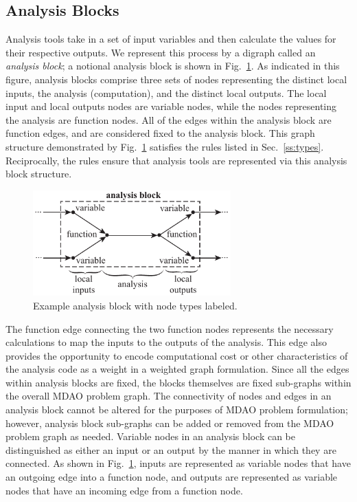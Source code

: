 \subsection{Analysis Blocks}
\label{ss:analysis blocks}
Analysis tools take in a set of input variables and then calculate 
the values for their respective outputs. We represent this process
by a digraph called an \emph{analysis block}; a notional analysis block is shown in Fig.~\ref{f:analysis block}. 
As indicated in this figure, analysis blocks comprise three sets of nodes representing the distinct local inputs, the analysis (computation), and the distinct local outputs. The local input and local outputs nodes are variable nodes, while the nodes representing the analysis are function nodes. All of the edges within the analysis block are function edges, and are considered fixed to the analysis block. This graph structure demonstrated by Fig.~\ref{f:analysis block} satisfies the rules listed in Sec.~\ref{ss:types}. Reciprocally, the rules ensure that analysis tools are represented via this analysis block structure.
\begin{figure}[htb]
    \begin{center}
    \includegraphics[width=3.0in]{images/analysis_block}
    \end{center}
    \vspace{-10pt}
\caption{Example analysis block with node types labeled.}
\label{f:analysis block}
\end{figure}

The function edge connecting the two function nodes represents the necessary calculations to map the inputs to the outputs of the analysis. 
This edge also provides the opportunity to encode computational cost or other characteristics of the analysis code as a weight in a weighted graph formulation. 
Since all the edges within analysis blocks are fixed, the blocks themselves are fixed sub-graphs within the overall MDAO problem graph. 
The connectivity of nodes and edges in an analysis block cannot be altered for the purposes of MDAO problem formulation; 
however, analysis block sub-graphs can be added or removed from the MDAO problem graph as needed.
Variable nodes in an analysis block can be distinguished as either an input or an output by the manner in which they are connected. 
As shown in Fig.~\ref{f:analysis block}, inputs are represented as variable nodes that have an outgoing edge into a function node, and outputs are represented as variable nodes that have an incoming edge from a function node. 

